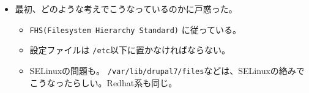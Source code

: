 \documentclass[mingoth,a4paper]{jsarticle}
\begin{document}
\begin{itemize}
\begin{itemize}
\begin{itemize}
      {\tt /var/lib/drupal7/backups} (*)

      アップロードされたファイル・ディレクトリ

    \item {\tt /etc/drupal/7}

      {\tt .htaccess}、 {\tt /sites}以下 {\tt /profile} 以下などユーザーが変更する設定やファイル類を配置

    \item {\tt /var/www}

      Drupalルートディレクトリ({\tt /usr/share/drupal7})へのシンボリックリンク

    \item {\tt /etc/cron.d/drupal7} (*)

      パッケージが用意しているcronファイル

    \item {\tt /etc/drupal7/apache2.conf} (*)

      Apache2の設定ファイル {\tt /etc/apach2/conf.d} へシンボリックリンクを貼って使う

    \item {\tt /var/lib/drupal7/backups} (*)

      パッケージが用意しているバックアップスクリプト用と思われる

    \item {\tt /usr/share/doc/drupal7/scripts/} 以下 (*)

      パッケージが用意しているさまざまなシェルスクリプト群

    \item {\tt /etc/dbconfig-common/drupal7.conf} (*)

      パッケージが生成するコンフィグファイル

    \item {\tt /usr/share/doc/drupal7/dbconfig.template} (*)

      パッケージが用意しているデータベースコンフィグサンプル
    \end{itemize}

  \item 最初、どのような考えでこうなっているのかに戸惑った。
    \begin{itemize}
    \item {\tt FHS(Filesystem Hierarchy Standard)} に従っている。\cite{policyfhs}\cite{wikifhs}
    \item 設定ファイルは {\tt /etc}以下に置かなければならない。\cite{policyfiles}
    \item SELinuxの問題も。
      {\tt /var/lib/drupal7/files}などは、SELinuxの絡みでこうなったらしい。Redhat系も同じ。\cite{bugselinux}
    \end{itemize}


\end{itemize}
\end{itemize}
\end{document}
